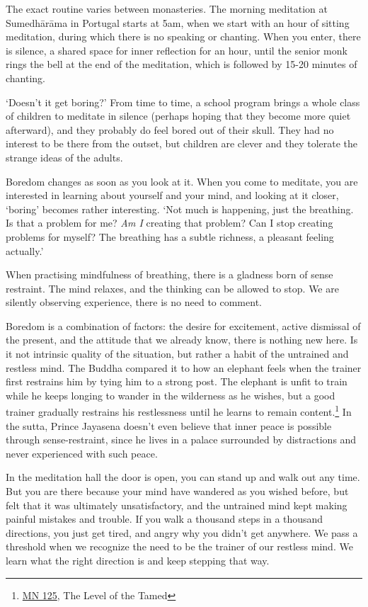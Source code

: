 The exact routine varies between monasteries. The morning meditation at
Sumedhārāma in Portugal starts at 5am, when we start with an hour of
sitting meditation, during which there is no speaking or chanting. When
you enter, there is silence, a shared space for inner reflection for an
hour, until the senior monk rings the bell at the end of the meditation,
which is followed by 15-20 minutes of chanting.

\clearpage


`Doesn't it get boring?' From time to time, a school program brings a
whole class of children to meditate in silence (perhaps hoping that they
become more quiet afterward), and they probably do feel bored out of
their skull. They had no interest to be there from the outset, but
children are clever and they tolerate the strange ideas of the adults.

Boredom changes as soon as you look at it. When you come to meditate,
you are interested in learning about yourself and your mind, and looking
at it closer, `boring' becomes rather interesting. `Not much is
happening, just the breathing. Is that a problem for me? \emph{Am I}
creating that problem? Can I stop creating problems for myself? The
breathing has a subtle richness, a pleasant feeling actually.'

When practising mindfulness of breathing, there is a gladness born of
sense restraint. The mind relaxes, and the thinking can be allowed to
stop. We are silently observing experience, there is no need to comment.

Boredom is a combination of factors: the desire for excitement, active
dismissal of the present, and the attitude that we already know, there
is nothing new here. Is it not intrinsic quality of the situation, but
rather a habit of the untrained and restless mind. The Buddha compared
it to how an elephant feels when the trainer first restrains him by
tying him to a strong post. The elephant is unfit to train while he
keeps longing to wander in the wilderness as he wishes, but a good
trainer gradually restrains his restlessness until he learns to remain
content.\footnote{\href{https://suttacentral.net/mn125}{MN 125}, The
  Level of the Tamed} In the sutta, Prince Jayasena doesn't even believe
that inner peace is possible through sense-restraint, since he lives in
a palace surrounded by distractions and never experienced with such
peace.

In the meditation hall the door is open, you can stand up and walk out
any time. But you are there because your mind have wandered as you
wished before, but felt that it was ultimately unsatisfactory, and the
untrained mind kept making painful mistakes and trouble. If you walk a
thousand steps in a thousand directions, you just get tired, and angry
why you didn't get anywhere. We pass a threshold when we recognize the
need to be the trainer of our restless mind. We learn what the right
direction is and keep stepping that way.

